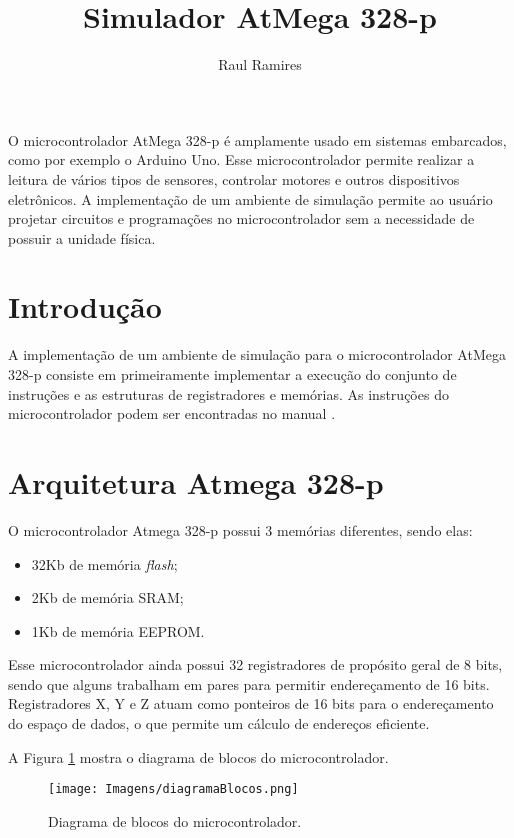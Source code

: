 \documentclass[12pt]{article}
\title{Simulador AtMega 328-p}
\author{Raul Ramires\inst{1}}
\begin{document}
 

\maketitle
     
\begin{resumo} 
O microcontrolador AtMega 328-p é amplamente usado em sistemas embarcados, como por exemplo o Arduino Uno. Esse microcontrolador permite realizar a leitura de vários tipos de sensores, controlar motores e outros dispositivos eletrônicos. A implementação de um ambiente de simulação permite ao usuário projetar circuitos e programações no microcontrolador sem a necessidade de possuir a unidade física.
\end{resumo}


\section{Introdução}

A implementação de um ambiente de simulação para o microcontrolador AtMega 328-p consiste em primeiramente implementar a execução do conjunto de instruções e as estruturas de registradores e memórias. As instruções do microcontrolador podem ser encontradas no manual \cite{man328p}.

\section{Arquitetura Atmega 328-p}
O microcontrolador Atmega 328-p possui 3 memórias diferentes, sendo elas:

\begin{itemize}
\item 32Kb de memória \textit{flash};
\item 2Kb de memória SRAM;
\item 1Kb de memória EEPROM.
\end{itemize}

Esse microcontrolador ainda possui 32 registradores de propósito geral de 8 bits, sendo que alguns trabalham em pares para permitir endereçamento de 16 bits. Registradores X, Y e Z atuam como ponteiros de 16 bits para o endereçamento do espaço de dados, o que permite um cálculo de endereços eficiente.

A Figura \ref{figBlocos} mostra o diagrama de blocos do microcontrolador.

\begin{figure}[H]
  \centering
  \texttt{[image: Imagens/diagramaBlocos.png]}
  \caption{Diagrama de blocos do microcontrolador.}
  \label{figBlocos}
\end{figure}
\end{document}
